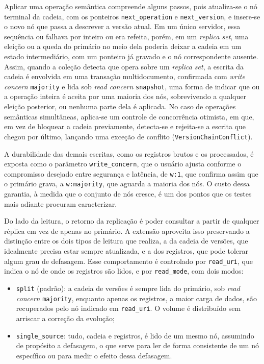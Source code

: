 Aplicar uma operação semântica compreende alguns passos, pois atualiza-se o nó terminal da cadeia, com os ponteiros \texttt{next\_operation} e \texttt{next\_version}, e insere-se o novo nó que passa a descrever a versão atual. Em um único servidor, essa sequência ou falhava por inteiro ou era refeita, porém, em um \textit{replica set}, uma eleição ou a queda do primário no meio dela poderia deixar a cadeia em um estado intermediário, com um ponteiro já gravado e o nó correspondente ausente. Assim, quando a coleção detecta que opera sobre um \textit{replica set}, a escrita da cadeia é envolvida em uma transação multidocumento, confirmada com \textit{write concern} \texttt{majority} e lida sob \textit{read concern} \texttt{snapshot}, uma forma de indicar que ou a operação inteira é aceita por uma maioria dos nós, sobrevivendo a qualquer eleição posterior, ou nenhuma parte dela é aplicada. No caso de operações semânticas simultâneas, aplica-se um controle de concorrência otimista, em que, em vez de bloquear a cadeia previamente, detecta-se e rejeita-se a escrita que chegou por último, lançando uma exceção de conflito (\texttt{VersionChainConflict}).

A durabilidade das demais escritas, como os registros brutos e os processados, é exposta como o parâmetro \texttt{write\_concern}, que o usuário ajusta conforme o compromisso desejado entre segurança e latência, de \texttt{w:1}, que confirma assim que o primário grava, a \texttt{w:majority}, que aguarda a maioria dos nós. O custo dessa garantia, à medida que o conjunto de nós cresce, é um dos pontos que os testes mais adiante procuram caracterizar.

Do lado da leitura, o retorno da replicação é poder consultar a partir de qualquer réplica em vez de apenas no primário. A extensão aproveita isso preservando a distinção entre os dois tipos de leitura que realiza, a da cadeia de versões, que idealmente precisa estar sempre atualizada, e a dos registros, que pode tolerar algum grau de defasagem. Esse comportamento é controlado por \texttt{read\_uri}, que indica o nó de onde os registros são lidos, e por \texttt{read\_mode}, com dois modos:
\begin{itemize}
    \item \texttt{split} (padrão): a cadeia de versões é sempre lida do primário, sob \textit{read concern} \texttt{majority}, enquanto apenas os registros, a maior carga de dados, são recuperados pelo nó indicado em \texttt{read\_uri}. O volume é distribuído sem arriscar a correção da evolução;
    \item \texttt{single\_source}: tudo, cadeia e registros, é lido de um mesmo nó, assumindo de propósito a defasagem, o que serve para ler de forma consistente de um nó específico ou para medir o efeito dessa defasagem.
\end{itemize}

